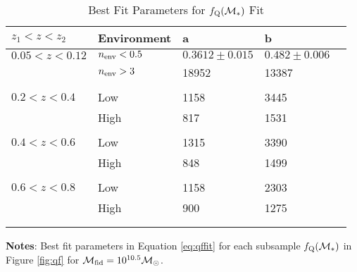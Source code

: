 \documentclass{emulateapj}
\begin{document}
\begin{table} 
  \caption{Best Fit Parameters for $f_{\rm{Q}}(\mathcal{M}_{*})$ Fit}
  \label{tab:bestfitparam}
  \begin{center}
    \leavevmode
    \begin{tabular}{lllll} \hline \hline              
    $z_1 < z < z_2$ &Environment        &a  &b  \\ \hline 
$0.05 < z< 0.12$ &$n_{\rm{env}} < 0.5$           &$0.3612 \pm 0.015$	&$0.482 \pm 0.006$                           \\
               &$n_{\rm{env}} > 3$            &18952                       &13387                           \\ 
                              &               &                       &                           \\ \hline
$0.2 < z <0.4$      &Low           &1158                    &3445                           \\
               &High            &817                    &1531                           \\
               &               &                       &                           \\ \hline
$0.4 < z < 0.6$      &Low           &1315                       &3390                           \\
               &High            &848                       &1499                           \\
               &               &                       &                           \\ \hline
$0.6 < z < 0.8$      &Low           &1158                       &2303                           \\
               &High            &900                       &1275                           \\
               &               &                       &                           \\ \hline
  \multicolumn{4}{l}{}                                             \\       
    \end{tabular} \par
    \end{center}
    {\bf Notes}: Best fit parameters in Equation \ref{eq:qffit} for each subsample $f_{\rm{Q}}(\mathcal{M}_{*})$ in Figure \ref{fig:qf} for $\mathcal{M}_{\rm{fid}} = 10^{10.5} \mathcal{M}_{\odot}$.
\end{table}
\end{document}
